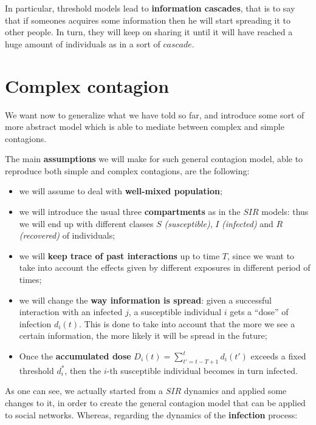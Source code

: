 \documentclass[../main/main.tex]{subfiles}
\begin{document}
In particular, threshold models lead to \textbf{information cascades}, that is to say that if someones acquires some information then he will start spreading it to other people. In turn, they will keep on sharing it until it will have reached a huge amount of individuals as in a sort of $cascade$. 


\section{Complex contagion}

We want now to generalize what we have told so far, and introduce some sort of more abstract model which is able to mediate between complex and simple contagions.

The main \textbf{assumptions} we will make for such general contagion model, able to reproduce both simple and complex contagions, are the following:
\begin{itemize}
\item we will assume to deal with \textbf{well-mixed population};

\item we will introduce the usual three \textbf{compartments} as in the $SIR$ models: thus we will end up with different classes \( S \) \textit{(susceptible)}, \( I \) \textit{(infected)} and \( R \) \textit{(recovered)} of individuals;

\item we will \textbf{keep trace of past interactions} up to time $T$, since we want to take into account the effects given by different exposures in different period of times;

\item we will change the \textbf{way information is spread}: given a successful interaction with an infected $j$, a susceptible individual $i$ gets a “dose” of infection $d_i(t)$. This is done to take into account that the more we see a certain information, the more likely it will be spread in the future;

\item Once the \textbf{accumulated dose} $D_i(t) = \sum_{t'=t-T+1}^{t} d_i(t')$ exceeds a fixed threshold $d_i^*$, then the $i$-th susceptible individual becomes in turn infected.

\end{itemize}

As one can see, we actually started from a $SIR$ dynamics and applied some changes to it, in order to create the general contagion model that can be applied to social networks. 
Whereas, regarding the dynamics of the \textbf{infection} process:
\end{document}
